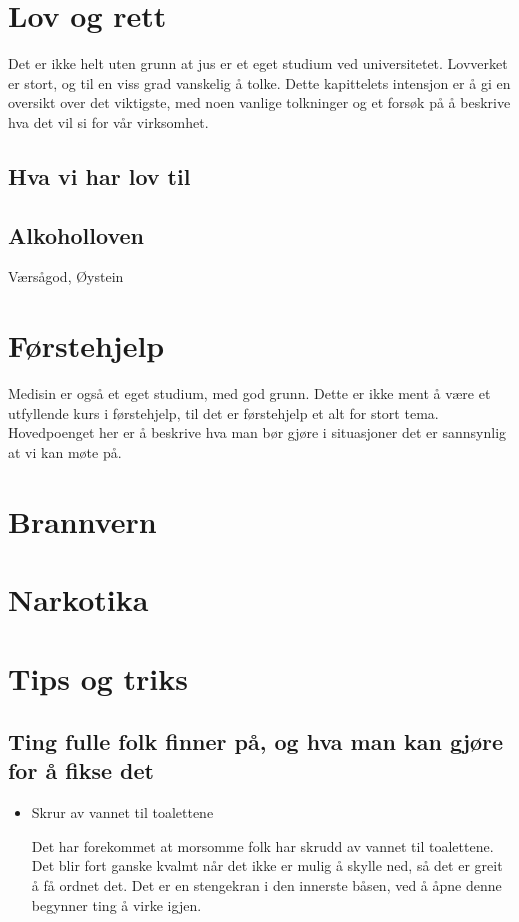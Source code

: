 \documentclass[11pt,norsk,a4paper]{article}
\begin{document}
\section{Lov og rett}

Det er ikke helt uten grunn at jus er et eget studium ved universitetet. Lovverket er stort, og til en viss grad vanskelig å tolke. Dette kapittelets intensjon er å gi en oversikt over det viktigste, med noen vanlige tolkninger og et forsøk på å beskrive hva det vil si for vår virksomhet.

\subsection{Hva vi har lov til}

\subsection{Alkoholloven}
Værsågod, Øystein

\section{Førstehjelp}

Medisin er også et eget studium, med god grunn. Dette er ikke ment å være et utfyllende kurs i førstehjelp, til det er førstehjelp et alt for stort tema. Hovedpoenget her er å beskrive hva man bør gjøre i situasjoner det er sannsynlig at vi kan møte på.

\section{Brannvern} \label{brann}

\section{Narkotika}



\section{Tips og triks}

\subsection{Ting fulle folk finner på, og hva man kan gjøre for å fikse det}
\begin{itemize}
 \item {Skrur av vannet til toalettene}

Det har forekommet at morsomme folk har skrudd av vannet til toalettene. Det blir fort ganske kvalmt når det ikke er mulig å skylle ned, så det er greit å få ordnet det. Det er en stengekran i den innerste båsen, ved å åpne denne begynner ting å virke igjen.
\end{itemize}
\end{document}
